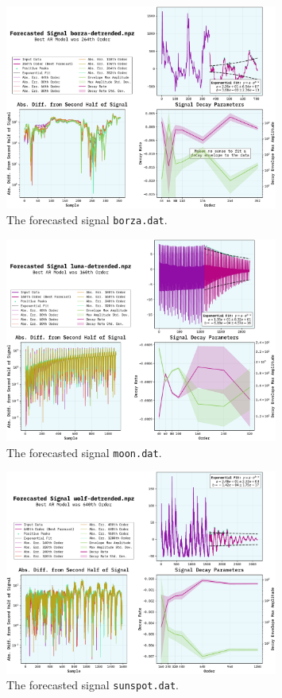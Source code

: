 \documentclass[10pt, titlepage, a4paper]{article}
\begin{document}
\begin{figure}[H]
    \centering
    \includegraphics[width=0.8\textwidth]{../LinForecast/Images/forecast-borza-detrended.npz-lin.pdf}
    \caption{The forecasted signal \texttt{borza.dat}.}
    \label{fig:forecast-4}
\end{figure}

\begin{figure}[H]
    \centering
    \includegraphics[width=0.8\textwidth]{../LinForecast/Images/forecast-luna-detrended.npz.pdf}
    \caption{The forecasted signal \texttt{moon.dat}.}
    \label{fig:forecast-5}
\end{figure}

\begin{figure}[H]
    \centering
    \includegraphics[width=0.8\textwidth]{../LinForecast/Images/forecast-wolf-detrended.npz.pdf}
    \caption{The forecasted signal \texttt{sunspot.dat}.}
    \label{fig:forecast-6}
\end{figure}
\end{document}
